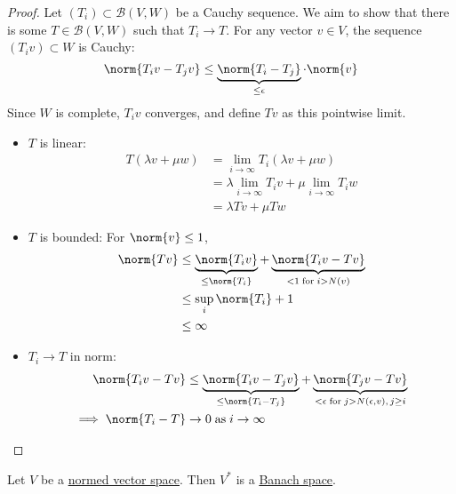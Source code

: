 \documentclass{article}
\begin{document}
\begin{proof}
    Let $(T_i) \subset \mathcal{B}(V, W)$ be a Cauchy sequence.  We aim to show that there is some $T \in \mathcal{B}(V, W)$ such that $T_i \to T$.
    For any vector $v \in V$, the sequence $(T_i v) \subset W$ is Cauchy:
    \begin{equation*}
        \norm{T_i v - T_j v} \leq \underbrace{\norm{T_i - T_j}}_{\leq \epsilon} \cdot \norm{v}
    \end{equation*}
    Since $W$ is complete, $T_i v$ converges, and define $T v$ as this pointwise limit.
    \begin{itemize}
        \item $T$ is linear:
            \begin{align*}
                T(\lambda v + \mu w) &= \lim_{i \to \infty} T_i (\lambda v + \mu w) \\
                                     &= \lambda \lim_{i \to \infty} T_i v + \mu \lim_{i \to \infty} T_i w \\
                                     &= \lambda T v + \mu T w
            \end{align*}
        \item $T$ is bounded:
            For $\norm{v} \leq 1$,
            \begin{align*}
                \norm{Tv} &\leq \underbrace{\norm{T_i v}}_{\leq \norm{T_i}} + \underbrace{\norm{T_i v - T v}}_{<1 \; \text{for} \; i > N(v)} \\
                &\leq \sup_i \norm{T_i} + 1\\
                &\leq \infty
            \end{align*}

        \item $T_i \to T$ in norm:
            \begin{align*}
                \norm{T_i v - T v} &\leq \underbrace{\norm{T_i v - T_j v}}_{\leq \norm{T_i - T_j}} + \underbrace{\norm{T_j v - T v}}_{< \epsilon \; \text{for} \; j > N(\epsilon, v),\, j \geq i} \\
                \implies \norm{T_i - T} &\to 0 \; \text{as} \; i \to \infty
            \end{align*}
    \end{itemize}
\end{proof}

\begin{cor}
    Let $V$ be a \hyperlink{def:normedVectorSpace}{normed vector space}. Then $V^*$ is a \hyperlink{def:banach}{Banach space}.
\end{cor}
\end{document}
